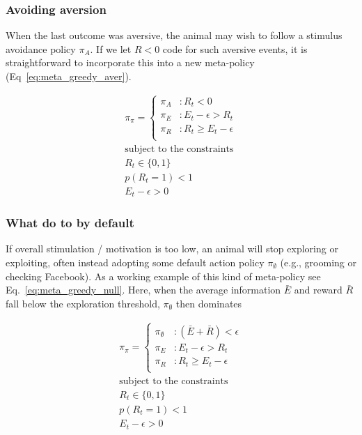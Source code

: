 \documentclass[9pt,twocolumn,twoside]{pnas-new}
\begin{document}
\subsubsection*{Avoiding aversion}
When the last outcome was aversive, the animal may wish to follow a stimulus avoidance policy $\pi_A$. If we let $R < 0$ code for such aversive events, it is straightforward to incorporate this into a new meta-policy (Eq~\ref{eq:meta_greedy_aver}).

\begin{equation} \label{eq:meta_greedy_aver}
    \begin{split}
        \pi_{\pi} = 
        \begin{cases}
            \pi_A & : R_t < 0 \\
            \pi_E & : E_t - \epsilon > R_t \\
            \pi_R & : R_t \geq E_t - \epsilon \\
        \end{cases}\\
        \text{subject to the constraints}\\
        R_t \in \{0, 1\}\\ 
        p(R_t = 1) < 1\\
        E_t - \epsilon > 0
    \end{split}
\end{equation}


\subsubsection*{What do to by default}
If overall stimulation / motivation is too low, an animal will stop exploring or exploiting, often instead adopting some default action policy $\pi_{\emptyset}$ (e.g., grooming or checking Facebook). As a working example of this kind of meta-policy see Eq.~\ref{eq:meta_greedy_null}. Here, when the average information $\bar E$ and reward $\bar R$ fall below the exploration threshold, $\pi_{\emptyset}$ then dominates 

\begin{equation} \label{eq:meta_greedy_null}
    \begin{split}
        \pi_{\pi} = 
        \begin{cases}
            \pi_{\emptyset} & : (\bar E + \bar R) < \epsilon \\
            \pi_E & : E_t - \epsilon > R_t \\
            \pi_R & : R_t \geq E_t - \epsilon \\
        \end{cases}\\
        \text{subject to the constraints}\\
        R_t \in \{0, 1\}\\ 
        p(R_t = 1) < 1\\
        E_t - \epsilon > 0
    \end{split}
\end{equation}
\end{document}
